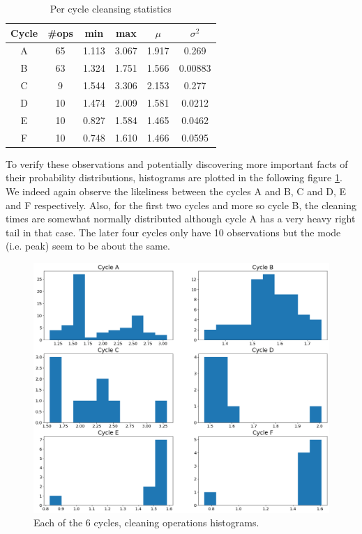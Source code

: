 \documentclass[../Thesis.tex]{subfiles}
\begin{document}
\begin{table}[h]
    \centering
    \begin{tabular}{c|c|c|c|c|c}
        Cycle & \#ops & min & max & $\mu$ & $\sigma^2$\\ \hline
        A & 65 & 1.113 & 3.067 & 1.917 & 0.269\\
        B & 63 & 1.324 & 1.751 & 1.566 & 0.00883\\
        C & 9  & 1.544 & 3.306 & 2.153 & 0.277\\
        D & 10 & 1.474 & 2.009 & 1.581 & 0.0212\\
        E & 10 & 0.827 & 1.584 & 1.465 & 0.0462\\
        F & 10 & 0.748 & 1.610 & 1.466 & 0.0595
    \end{tabular}
    \caption{Per cycle cleansing statistics}
    \label{tab:cycle cleansing stats stats}
\end{table}

To verify these observations and potentially discovering more important facts of their probability distributions, histograms are plotted in the following figure \ref{fig:cycle cleaning histograms}. We indeed again observe the likeliness between the cycles A and B, C and D, E and F respectively. Also, for the first two cycles and more so cycle B, the cleaning times are somewhat normally distributed although cycle A has a very heavy right tail in that case. The later four cycles only have 10 observations but the mode (i.e. peak) seem to be about the same.

\begin{figure}[h]
    \centering
    \includegraphics[width=0.8\linewidth]{figures/Multiple cycles data/Cleaning batches histograms.png}
    \caption{Each of the 6 cycles, cleaning operations histograms.}
    \label{fig:cycle cleaning histograms}
\end{figure}
\end{document}
